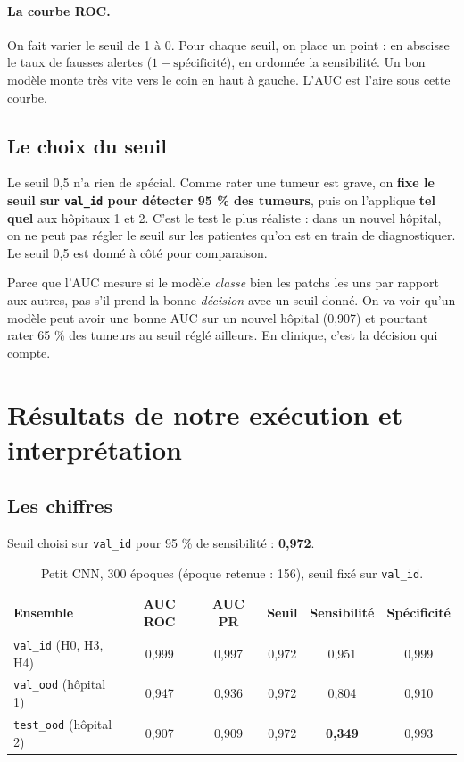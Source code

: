 \documentclass[11pt,a4paper]{article}
\begin{document}
\paragraph{La courbe ROC.} On fait varier le seuil de 1 à 0. Pour chaque seuil, on place un point :
en abscisse le taux de fausses alertes ($1 - \text{spécificité}$), en ordonnée la sensibilité. Un bon modèle
monte très vite vers le coin en haut à gauche. L'AUC est l'aire sous cette courbe.

\subsection{Le choix du seuil}
Le seuil 0,5 n'a rien de spécial. Comme rater une tumeur est grave, on \textbf{fixe le seuil sur
\texttt{val\_id} pour détecter 95 \% des tumeurs}, puis on l'applique \textbf{tel quel} aux hôpitaux 1 et 2.
C'est le test le plus réaliste : dans un nouvel hôpital, on ne peut pas régler le seuil sur les patientes
qu'on est en train de diagnostiquer. Le seuil 0,5 est donné à côté pour comparaison.

\begin{oral}
Parce que l'AUC mesure si le modèle \emph{classe} bien les patchs les uns par rapport aux autres, pas s'il
prend la bonne \emph{décision} avec un seuil donné. On va voir qu'un modèle peut avoir une bonne AUC sur un
nouvel hôpital (0,907) et pourtant rater 65 \% des tumeurs au seuil réglé ailleurs. En clinique, c'est la
décision qui compte.
\end{oral}

\section{Résultats de notre exécution et interprétation}

\subsection{Les chiffres}
Seuil choisi sur \texttt{val\_id} pour 95 \% de sensibilité : \textbf{0,972}.

\begin{table}[H]
\centering
\begin{tabular}{lccccc}
\toprule
\textbf{Ensemble} & \textbf{AUC ROC} & \textbf{AUC PR} & \textbf{Seuil} & \textbf{Sensibilité} & \textbf{Spécificité} \\
\midrule
\texttt{val\_id} (H0, H3, H4) & 0,999 & 0,997 & 0,972 & 0,951 & 0,999 \\
\texttt{val\_ood} (hôpital 1) & 0,947 & 0,936 & 0,972 & 0,804 & 0,910 \\
\texttt{test\_ood} (hôpital 2) & 0,907 & 0,909 & 0,972 & \cellcolor{orangeclair}\textbf{0,349} & 0,993 \\
\bottomrule
\end{tabular}
\caption{Petit CNN, 300 époques (époque retenue : 156), seuil fixé sur \texttt{val\_id}.}
\end{table}
\end{document}
